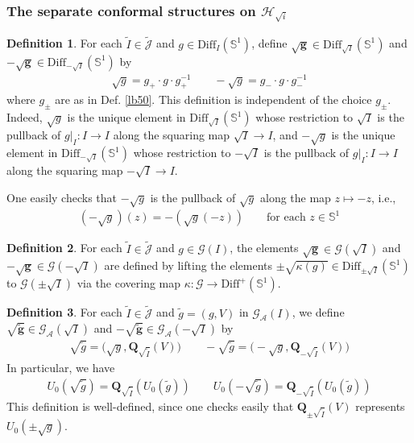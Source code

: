 \documentclass[11pt,b5paper,notitlepage]{article}
\theoremstyle{definition}
\newtheorem{df}{Definition}[section]
\theoremstyle{plain}
\newcommand{\wtd}{\widetilde}
\newcommand{\Diff}{\mathrm{Diff}}
\newcommand{\DiffS}{\mathrm{Diff}^+(\mathbb S^1)}
\newcommand{\GA}{\mathscr G_{\mathcal A}}
\newcommand{\Jtd}{\widetilde{\mathcal J}}
\newcommand{\Sbb}{{\mathbb S}}
\newcommand{\MH}{\mathcal H}
\newcommand{\SG}{\mathscr G}
\newcommand{\Qbf}{\mathbf Q}
\numberwithin{equation}{section}
\begin{document}
\subsubsection{The separate conformal structures on $\MH_{\sqrt i}$}

\begin{df}\label{lb126}
For each $\wtd I\in\Jtd$ and $g\in\Diff_I(\Sbb^1)$, define $\pmb{\sqrt g}\in\Diff_{\sqrt I}(\Sbb^1)$ and $\pmb{-\sqrt g}\in\Diff_{-\sqrt I}(\Sbb^1)$ by
\begin{align*}
\sqrt g=g_+\cdot g\cdot g_+^{-1}\qquad -\sqrt g=g_-\cdot g\cdot g_-^{-1}
\end{align*}
where $g_\pm$ are as in Def. \ref{lb50}. This definition is independent of the choice $g_\pm$. Indeed, $\sqrt g$ is the unique element in $\Diff_{\sqrt I}(\Sbb^1)$ whose restriction to $\sqrt I$ is the pullback of $g|_I:I\rightarrow I$ along the squaring map $\sqrt I\rightarrow I$, and $-\sqrt g$ is the unique element in $\Diff_{-\sqrt I}(\Sbb^1)$ whose restriction to $-\sqrt I$ is the pullback of $g|_I:I\rightarrow I$ along the squaring map $-\sqrt I\rightarrow I$. 
\end{df}

One easily checks that $-\sqrt g$ is the pullback of $\sqrt g$ along the map $z\mapsto -z$, i.e.,
\begin{align}
(-\sqrt g)(z)=-(\sqrt g(-z))\qquad\text{for each }z\in\Sbb^1
\end{align}

\begin{df}
For each $\wtd I\in\Jtd$ and $g\in\SG(I)$, the elements $\pmb{\sqrt g}\in\SG(\sqrt I)$ and $\pmb{-\sqrt g}\in\SG(-\sqrt I)$ are defined by lifting the elements $\pm\sqrt{\kappa(g)}\in \Diff_{\pm\sqrt I}(\Sbb^1)$ to $\SG(\pm\sqrt I)$ via the covering map $\kappa:\SG\rightarrow\DiffS$.
\end{df}



\begin{df}\label{lb54}
For each $\wtd I\in\Jtd$ and $\wtd g=(g,V)$ in $\GA(I)$, we define $\pmb{\sqrt{\wtd g}}\in\GA(\sqrt I)$ and $\pmb{-\sqrt{\wtd g}}\in\GA(-\sqrt I)$ by
\begin{align*}
\sqrt{\wtd g}=\big(\sqrt g,\Qbf_{\sqrt{\wtd I}}(V)\big)\qquad -\sqrt{\wtd g}=\big(-\sqrt g,\Qbf_{-\sqrt{\wtd I}}(V)\big)
\end{align*}
In particular, we have
\begin{align*}
U_0(\sqrt{\wtd g})=\Qbf_{\sqrt{\wtd I}}(U_0(\wtd g))\qquad U_0(-\sqrt{\wtd g})=\Qbf_{-\sqrt{\wtd I}}(U_0(\wtd g))
\end{align*}
This definition is well-defined, since one checks easily that $\Qbf_{\pm\sqrt{\wtd I}}(V)$ represents $U_0(\pm\sqrt g)$.
\end{df}
\end{document}
